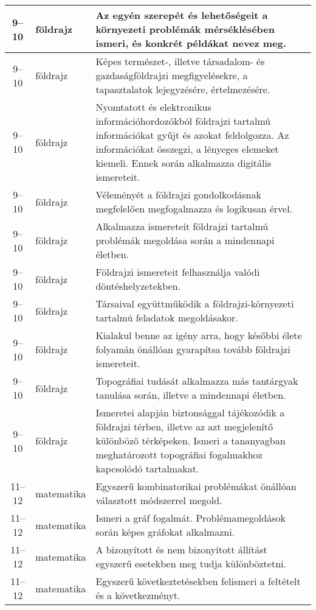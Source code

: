 \begin{small}
\begin{longtable}{c | p{2cm} |  p{11cm} }
              9--10 & földrajz & Az egyén szerepét és lehetőségeit a környezeti problémák mérséklésében ismeri, és konkrét példákat nevez meg. \\ \hline
              9--10 & földrajz & Képes természet-, illetve társadalom- és gazdaságföldrajzi megfigyelésekre, a tapasztalatok lejegyzésére, értelmezésére. \\ \hline
              9--10 & földrajz & Nyomtatott és elektronikus információhordozókból földrajzi tartalmú információkat gyűjt és azokat feldolgozza. Az információkat összegzi, a lényeges elemeket kiemeli. Ennek során alkalmazza digitális ismereteit. \\ \hline
              9--10 & földrajz & Véleményét a földrajzi gondolkodásnak megfelelően megfogalmazza és logikusan érvel. \\ \hline
              9--10 & földrajz & Alkalmazza ismereteit földrajzi tartalmú problémák megoldása során a mindennapi életben. \\ \hline
              9--10 & földrajz & Földrajzi ismereteit felhasználja valódi döntéshelyzetekben. \\ \hline
              9--10 & földrajz & Társaival együttműködik a földrajzi-környezeti tartalmú feladatok megoldásakor. \\ \hline
              9--10 & földrajz & Kialakul benne az igény arra, hogy későbbi élete folyamán önállóan gyarapítsa tovább földrajzi ismereteit. \\ \hline
              9--10 & földrajz & Topográfiai tudását alkalmazza más tantárgyak tanulása során, illetve a mindennapi életben. \\ \hline
              9--10 & földrajz & Ismeretei alapján biztonsággal tájékozódik a földrajzi térben, illetve az azt megjelenítő különböző térképeken. Ismeri a tananyagban meghatározott topográfiai fogalmakhoz kapcsolódó tartalmakat. \\ \hline
              11--12 & matematika & Egyszerű kombinatorikai problémákat önállóan választott módszerrel megold. \\ \hline
              11--12 & matematika & Ismeri a gráf fogalmát. Problémamegoldások során képes gráfokat alkalmazni. \\ \hline
              11--12 & matematika & A bizonyított és nem bizonyított állítást egyszerű esetekben meg tudja különböztetni. \\ \hline
              11--12 & matematika & Egyszerű következtetésekben felismeri a feltételt és a következményt. \\ \hline

\end{longtable}
\end{small}
